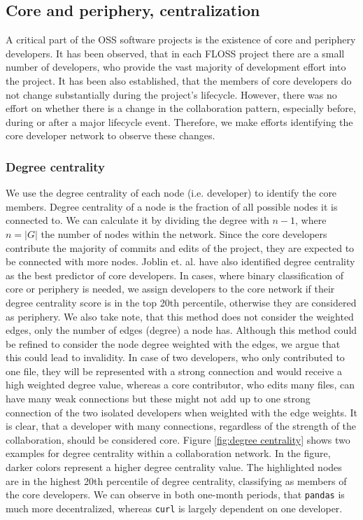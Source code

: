 \subsection{Core and periphery, centralization}
A critical part of the OSS software projects is the existence of core and periphery developers. It has been observed, that in each FLOSS project there are a small number of developers, who provide the vast majority of development effort into the project. It has been also established, that the members of core developers do not change substantially during the project's lifecycle. However, there was no effort on whether there is a change in the collaboration pattern, especially before, during or after a major lifecycle event. Therefore, we make efforts identifying the core developer network to observe these changes.

\subsubsection{Degree centrality}
\label{sec:deg_centrality}

We use the degree centrality of each node (i.e. developer) to identify the core members. Degree centrality of a node is the fraction of all possible nodes it is connected to. We can calculate it by dividing the degree with $n-1$, where $n = |G|$ the number of nodes within the network. Since the core developers contribute the majority of commits and edits of the project, they are expected to be connected with more nodes. Joblin et. al. \cite{joblinClassifyingDevelopersCore2016, joblinEvolutionaryTrendsDeveloper2017} have also identified degree centrality as the best predictor of core developers. In cases, where binary classification of core or periphery is needed, we assign developers to the core network if their degree centrality score is in the top 20th percentile, otherwise they are considered as periphery. We also take note, that this method does not consider the weighted edges, only the number of edges (degree) a node has. Although this method could be refined to consider the node degree weighted with the edges, we argue that this could lead to invalidity. In case of two developers, who only contributed to one file, they will be represented with a strong connection and would receive a high weighted degree value, whereas a core contributor, who edits many files, can have many weak connections but these might not add up to one strong connection of the two isolated developers when weighted with the edge weights. It is clear, that a developer with many connections, regardless of the strength of the collaboration, should be considered core. Figure \ref{fig:degree centrality} shows two examples for degree centrality within a collaboration network. In the figure, darker colors represent a higher degree centrality value. The  highlighted nodes are in the highest 20th percentile of degree centrality, classifying as members of the core developers. We can observe in both one-month periods, that \texttt{pandas} is much more decentralized, whereas \texttt{curl} is largely dependent on one developer.

